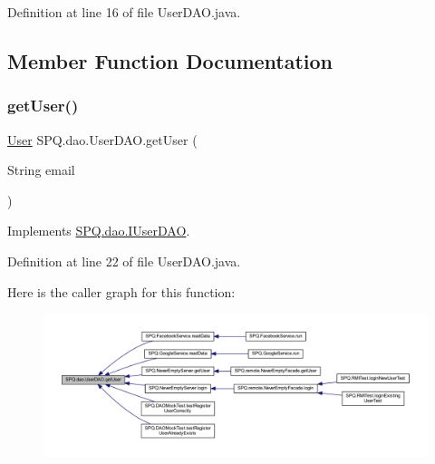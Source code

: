 Definition at line 16 of file User\+D\+A\+O.\+java.



\subsection{Member Function Documentation}
\mbox{\label{class_s_p_q_1_1dao_1_1_user_d_a_o_aeb3901e9e260ad977a1b412fe7a9fc0e}} 
\subsubsection{\texorpdfstring{get\+User()}{getUser()}\hspace{0.1cm}{\footnotesize\ttfamily [1/3]}}
{\footnotesize\ttfamily \mbox{\hyperlink{class_s_p_q_1_1data_1_1_user}{User}} S\+P\+Q.\+dao.\+User\+D\+A\+O.\+get\+User (\begin{DoxyParamCaption}\item[{String}]{email }\end{DoxyParamCaption})}



Implements \mbox{\hyperlink{interface_s_p_q_1_1dao_1_1_i_user_d_a_o_ac53b137d5e0828058457e59fa70c2b95}{S\+P\+Q.\+dao.\+I\+User\+D\+AO}}.



Definition at line 22 of file User\+D\+A\+O.\+java.

Here is the caller graph for this function\+:\nopagebreak
\begin{figure}[H]
\begin{center}
\leavevmode
\includegraphics[width=350pt]{class_s_p_q_1_1dao_1_1_user_d_a_o_aeb3901e9e260ad977a1b412fe7a9fc0e_icgraph}
\end{center}
\end{figure}
\mbox{\label{class_s_p_q_1_1dao_1_1_user_d_a_o_aeb3901e9e260ad977a1b412fe7a9fc0e}} 

